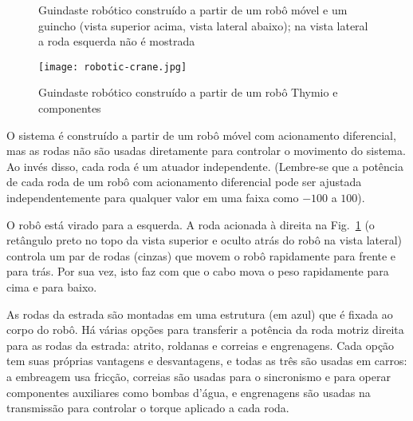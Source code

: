 {\begin{figure}
\begin{center}
\caption{Guindaste robótico construído a partir de um robô móvel e um guincho (vista superior acima, vista lateral abaixo); na vista lateral a roda esquerda não é mostrada}\label{fig.act-dof}
\end{center}
\end{figure}

\begin{figure}
\begin{center}
\texttt{[image: robotic-crane.jpg]}
\caption{Guindaste robótico construído a partir de um robô Thymio e componentes \lego}\label{fig.crane}
\end{center}
\end{figure}

O sistema é construído a partir de um robô móvel com acionamento diferencial, mas as rodas não são usadas diretamente para controlar o movimento do sistema. Ao invés disso, cada roda é um atuador independente. (Lembre-se que a potência de cada roda de um robô com acionamento diferencial pode ser ajustada independentemente para qualquer valor em uma faixa como $-100$ a $100$).

O robô está virado para a esquerda. A roda acionada à direita na Fig.~\ref{fig.act-dof} (o retângulo preto no topo da vista superior e oculto atrás do robô na vista lateral) controla um par de rodas (cinzas) que movem o robô rapidamente para frente e para trás. Por sua vez, isto faz com que o cabo mova o peso rapidamente para cima e para baixo.

As rodas da estrada são montadas em uma estrutura (em azul) que é fixada ao corpo do robô. Há várias opções para transferir a potência da roda motriz direita para as rodas da estrada: atrito, roldanas e correias e engrenagens. Cada opção tem suas próprias vantagens e desvantagens, e todas as três são usadas em carros: a embreagem usa fricção, correias são usadas para o sincronismo e para operar componentes auxiliares como bombas d'água, e engrenagens são usadas na transmissão para controlar o torque aplicado a cada roda.

}
